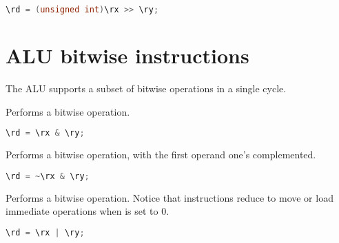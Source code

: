 \begin{lstlisting}[numbers=none, basicstyle=\ttfamily\footnotesize, language=C++]
\rd = (unsigned int)\rx >> \ry;
\end{lstlisting}

\section{ALU bitwise instructions}


The \rvex{} ALU supports a subset of bitwise operations in a single cycle.

Performs a bitwise  operation.

\begin{lstlisting}[numbers=none, basicstyle=\ttfamily\footnotesize, language=C++]
\rd = \rx & \ry;
\end{lstlisting}

Performs a bitwise  operation, with the first operand one's
complemented.

\begin{lstlisting}[numbers=none, basicstyle=\ttfamily\footnotesize, language=C++]
\rd = ~\rx & \ry;
\end{lstlisting}

Performs a bitwise  operation. Notice that  instructions
reduce to move or load immediate operations when  is set to 0.

\begin{lstlisting}[numbers=none, basicstyle=\ttfamily\footnotesize, language=C++]
\rd = \rx | \ry;
\end{lstlisting}

